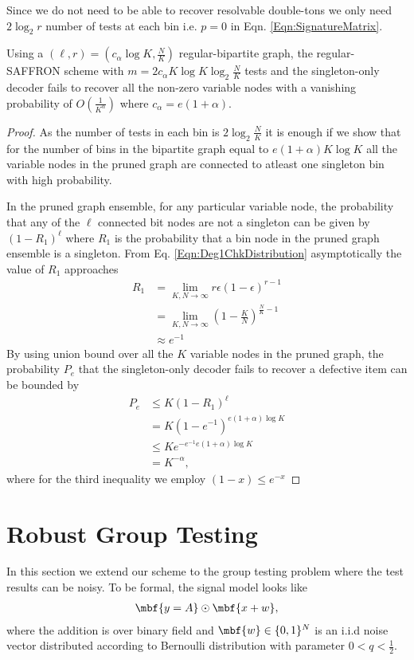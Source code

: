 \documentclass[conference,,twocolumn]{IEEEtran}
\begin{document}
Since we do not need to be able to recover resolvable double-tons we only need $2\log_2 r$ number of tests at each bin i.e. $p=0$ in Eqn. \eqref{Eqn:SignatureMatrix}.
\begin{theorem}
Using a $(\ell,r)=(c_\alpha \log K,\frac{N}{K})$ regular-bipartite graph, the regular-SAFFRON scheme with $m=2c_\alpha K\log K \log_2 \frac{N}{K}$ tests and the singleton-only decoder fails to recover all the non-zero variable nodes with a vanishing probability of $O(\frac{1}{K^{\alpha}})$ where $c_\alpha=e(1+\alpha)$.
\end{theorem}
\begin{proof}
As the number of tests in each bin is $2\log_2 \frac{N}{K}$ it is enough if we show that for the number of bins in the bipartite graph equal to $e(1+\alpha)K\log K$ all the variable nodes in the pruned graph are connected to atleast one singleton bin with high probability.

In the pruned graph ensemble, for any particular variable node, the probability that any of the $\ell$ connected bit nodes are not a singleton can be given by $(1-R_1)^\ell$ where $R_1$ is the probability that a bin node in the pruned graph ensemble is a singleton. From Eq. \ref{Eqn:Deg1ChkDistribution} asymptotically the value of $R_1$ approaches 
\begin{align*}
R_1&=\lim _{K,N\rightarrow\infty}r\epsilon(1-\epsilon)^{r-1}\\
     &=\lim _{K,N\rightarrow\infty}\left(1-\frac{K}{N}\right)^{\frac{N}{K}-1}\\
     &\approx e^{-1}
\end{align*} 
By using union bound over all the $K$ variable nodes in the pruned graph, the probability $P_e$ that the singleton-only decoder fails to recover a defective item can be bounded by
\begin{align*}
P_e&\leq K(1-R_1)^\ell \\
&=K\left(1-e^{-1}\right)^{e(1+\alpha)\log K}\\
&\leq Ke^{-e^{-1}e(1+\alpha)\log K}\\
&=K^{-\alpha},
\end{align*}
where for the third inequality we employ $(1-x)\leq e^{-x}$
\end{proof}


\section{Robust Group Testing}
\label{Sec:NoisyGroupTesting}
In this section we extend our scheme to the group testing problem where the test results can be noisy. To be formal, the signal model looks like
\begin{align*}
\mbf{y=A}\odot \mbf{x+w},
\end{align*}
where the addition is over binary field and $\mbf{w}\in\{0,1\}^N$ is an i.i.d noise vector distributed according to Bernoulli distribution with parameter $0<q<\frac{1}{2}$.
\end{document}
